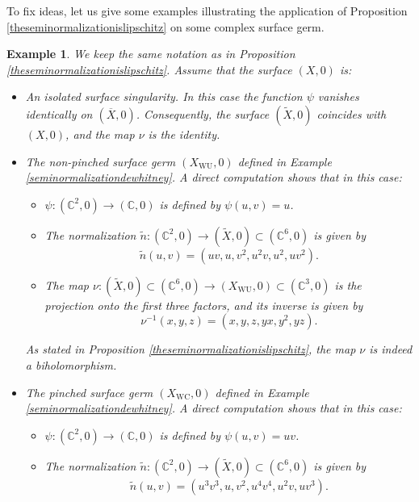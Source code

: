 \documentclass[reqno,dvipsnames,12pt]{amsart}
\newtheorem{exam}[thm]{Example}
\begin{document}
To fix ideas, let us give some examples illustrating the application of Proposition \ref{theseminormalizationislipschitz} on some complex surface germ.
\begin{exam}\label{application1}
We keep the same notation as in Proposition \ref{theseminormalizationislipschitz}. 
Assume that the surface $(X,0)$ is:

\begin{itemize}

\item An isolated surface singularity. In this case the function $\psi$ vanishes identically on $(\overline{X},0)$. Consequently, the surface $(\widetilde{X},0)$ coincides with $(X,0)$, and the map $\nu$ is the identity.

\item The non-pinched surface germ $(X_{\mathrm{WU}},0)$ defined in Example \ref{seminormalizationdewhitney}. A direct computation shows that in this case:

\begin{itemize}
    \item $\psi : (\mathbb{C}^2,0) \longrightarrow (\mathbb{C},0)$ is defined by $\psi(u,v)=u$.
    
    \item The normalization 
    $
    \widetilde{n} : (\mathbb{C}^2,0) \longrightarrow (\widetilde{X},0)\subset (\mathbb{C}^6,0)
    $
    is given by
    $$
    \widetilde{n}(u,v)=(uv,u,v^2,u^2v,u^2,uv^2).
    $$
    
    \item The map 
    $
    \nu : (\widetilde{X},0)\subset (\mathbb{C}^6,0) \longrightarrow (X_{\mathrm{WU}},0)\subset (\mathbb{C}^3,0)
    $
    is the projection onto the first three factors, and its inverse is given by
    $$
    \nu^{-1}(x,y,z)=(x,y,z,yx,y^2,yz).
    $$
\end{itemize}

As stated in Proposition \ref{theseminormalizationislipschitz}, the map $\nu$ is indeed a biholomorphism.

\item The pinched surface germ $(X_{\mathrm{WC}},0)$ defined in Example \ref{seminormalizationdewhitney}. A direct computation shows that in this case:

\begin{itemize}
    \item $\psi : (\mathbb{C}^2,0) \longrightarrow (\mathbb{C},0)$ is defined by $\psi(u,v)=uv$.
    
    \item The normalization 
    $
    \widetilde{n} : (\mathbb{C}^2,0) \longrightarrow (\widetilde{X},0)\subset (\mathbb{C}^6,0)
    $
    is given by
    $$
    \widetilde{n}(u,v)=(u^3v^3,u,v^2,u^4v^4,u^2v,uv^3).
    $$
    

\end{itemize}
\end{itemize}
\end{exam}
\end{document}
